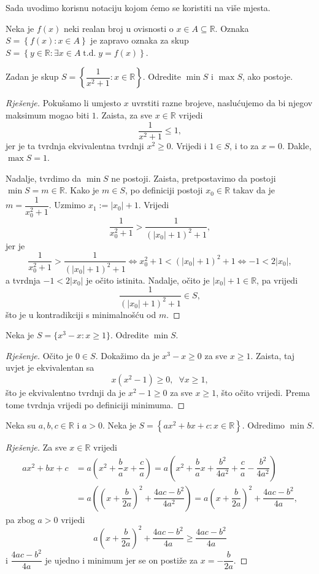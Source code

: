 Sada uvodimo korisnu notaciju kojom ćemo se koristiti na više mjesta.

\begin{definition}
Neka je $f(x)$ neki realan broj u ovisnosti o $x\in A\subseteq \mathbb{R}$. Oznaka $S=\left\{f(x) : x\in A\right\}$ je zapravo oznaka za skup $S=\left\{y\in \mathbb{R} : \exists x\in A \;\mathrm{t.d.}\; y=f(x)\right\}$.
\end{definition}

\begin{exercise}
Zadan je skup $S=\left\{\dfrac{1}{x^2+1} : x\in \mathbb{R}\right\}$. Odredite $\min{S}$ i $\max{S}$, ako postoje.
\end{exercise}
\begin{proof}[Rješenje]
Pokušamo li umjesto $x$ uvrstiti razne brojeve, naslućujemo da bi njegov maksimum mogao biti $1$. Zaista, za sve $x\in \mathbb{R}$ vrijedi $$\dfrac{1}{x^2+1}\leq 1,$$ jer je ta tvrdnja ekvivalentna tvrdnji $x^2\geq 0$. Vrijedi i $1\in S$, i to za $x=0$. Dakle, $\max{S}=1$. 

Nadalje, tvrdimo da $\min{S}$ ne postoji. Zaista, pretpostavimo da postoji $\min{S}=m\in \mathbb{R}$. Kako je $m\in S$, po definiciji postoji $x_0\in \mathbb{R}$ takav da je $m=\dfrac{1}{x_0^2+1}$. Uzmimo $x_1:=|x_0|+1$. Vrijedi $$\dfrac{1}{x_0^2+1}> \dfrac{1}{(|x_0|+1)^2+1},$$
jer je
$$\dfrac{1}{x_0^2+1}> \dfrac{1}{(|x_0|+1)^2+1}\Leftrightarrow x_0^2+1<(|x_0|+1)^2+1\Leftrightarrow -1<2|x_0|,$$
a tvrdnja $-1<2|x_0|$ je očito istinita. Nadalje, očito je $|x_0|+1\in \mathbb{R}$, pa vrijedi $$\dfrac{1}{(|x_0|+1)^2+1}\in S,$$ što je u kontradikciji s minimalnošću od $m$.
\end{proof}
\begin{exercise}
Neka je $S=\{x^3-x : x\geq 1\}$. Odredite $\min{S}$.
\end{exercise}
\begin{proof}[Rješenje]
Očito je $0\in S$. Dokažimo da je $x^3-x\geq 0$ za sve $x\geq 1$. Zaista, taj uvjet je ekvivalentan sa 
$$x(x^2-1)\geq 0, \;\; \forall x\geq 1,$$
što je ekvivalentno tvrdnji da je $x^2-1\geq 0$ za sve $x\geq 1$, što očito vrijedi. Prema tome tvrdnja vrijedi po definiciji minimuma.
\end{proof}
\begin{exercise}
\label{tjeme}
Neka su $a, b, c\in \mathbb{R}$ i $a> 0$. Neka je $S=\left\{ax^2+bx+c : x\in \mathbb{R}\right\}$. Odredimo $\min{S}$.
\end{exercise}
\begin{proof}[Rješenje]
Za sve $x\in \mathbb{R}$ vrijedi
\begin{align*}
ax^2+bx+c&=a\left(x^2+\dfrac{b}{a}x+\dfrac{c}{a}\right)=a\left(x^2+\dfrac{b}{a}x+\dfrac{b^2}{4a^2}+\dfrac{c}{a}-\dfrac{b^2}{4a^2}\right)\\
&=a\left(\left(x+\dfrac{b}{2a}\right)^2+\dfrac{4ac-b^2}{4a^2}\right)=a\left(x+\dfrac{b}{2a}\right)^2+\dfrac{4ac-b^2}{4a},
\end{align*}
pa zbog $a>0$ vrijedi $$a\left(x+\dfrac{b}{2a}\right)^2+\dfrac{4ac-b^2}{4a}\geq \dfrac{4ac-b^2}{4a}$$ 
i $\dfrac{4ac-b^2}{4a}$ je ujedno i minimum jer se on postiže za $x=-\dfrac{b}{2a}$.
\end{proof}
